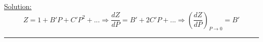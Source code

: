 \noindent
\underline{Solution:}\\

$$Z = 1 + B'P + C'P^2 + ... \Rightarrow \frac{dZ}{dP} = B' + 2C'P + ... \Rightarrow \left(\frac{dZ}{dP}\right)_{P\rightarrow 0} = B'$$

\hrule\vspace{0.5cm}
